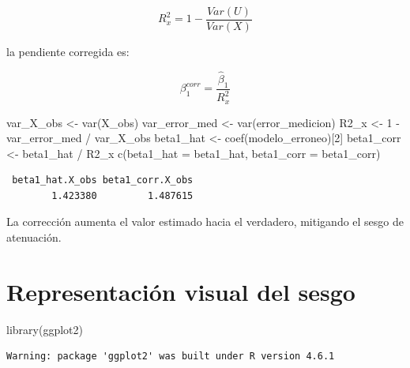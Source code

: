 \documentclass[
  spanish,
  letterpaper,
  DIV=11,
  numbers=noendperiod]{scrreprt}
\newenvironment{Shaded}{\begin{snugshade}}{\end{snugshade}}
\newcommand{\AttributeTok}[1]{\textcolor[rgb]{0.40,0.45,0.13}{#1}}
\newcommand{\DecValTok}[1]{\textcolor[rgb]{0.68,0.00,0.00}{#1}}
\newcommand{\FunctionTok}[1]{\textcolor[rgb]{0.28,0.35,0.67}{#1}}
\newcommand{\NormalTok}[1]{\textcolor[rgb]{0.00,0.23,0.31}{#1}}
\newcommand{\OtherTok}[1]{\textcolor[rgb]{0.00,0.23,0.31}{#1}}
\newcommand{\SpecialCharTok}[1]{\textcolor[rgb]{0.37,0.37,0.37}{#1}}
\begin{document}
\[R_x^2 = 1 - \frac{Var(U)}{Var(X)}\]

la pendiente corregida es:

\[\beta_1^{corr} = \frac{\hat{\beta}_1}{R_x^2}\]

\begin{Shaded}
\begin{Highlighting}[]
\NormalTok{var\_X\_obs }\OtherTok{\textless{}{-}} \FunctionTok{var}\NormalTok{(X\_obs)}
\NormalTok{var\_error\_med }\OtherTok{\textless{}{-}} \FunctionTok{var}\NormalTok{(error\_medicion)}
\NormalTok{R2\_x }\OtherTok{\textless{}{-}} \DecValTok{1} \SpecialCharTok{{-}}\NormalTok{ var\_error\_med }\SpecialCharTok{/}\NormalTok{ var\_X\_obs}
\NormalTok{beta1\_hat }\OtherTok{\textless{}{-}} \FunctionTok{coef}\NormalTok{(modelo\_erroneo)[}\DecValTok{2}\NormalTok{]}
\NormalTok{beta1\_corr }\OtherTok{\textless{}{-}}\NormalTok{ beta1\_hat }\SpecialCharTok{/}\NormalTok{ R2\_x}
\FunctionTok{c}\NormalTok{(}\AttributeTok{beta1\_hat =}\NormalTok{ beta1\_hat, }\AttributeTok{beta1\_corr =}\NormalTok{ beta1\_corr)}
\end{Highlighting}
\end{Shaded}

\begin{verbatim}
 beta1_hat.X_obs beta1_corr.X_obs 
        1.423380         1.487615 
\end{verbatim}

La corrección aumenta el valor estimado hacia el verdadero, mitigando el
sesgo de atenuación.

\section{Representación visual del
sesgo}\label{representaciuxf3n-visual-del-sesgo}

\begin{Shaded}
\begin{Highlighting}[]
\FunctionTok{library}\NormalTok{(ggplot2)}
\end{Highlighting}
\end{Shaded}

\begin{verbatim}
Warning: package 'ggplot2' was built under R version 4.6.1
\end{verbatim}
\end{document}
